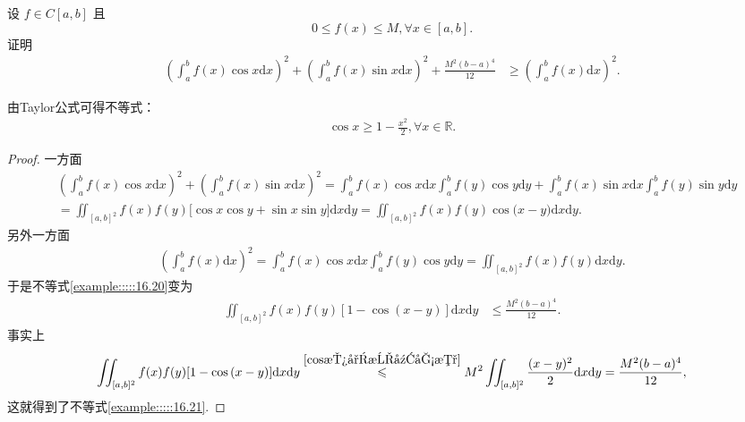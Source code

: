 \documentclass[../../main.tex]{subfiles}
\begin{document}
\begin{example}
设 $f \in C[a,b]$ 且
\[0 \leqslant f(x) \leqslant M, \forall x \in [a,b].\]
证明
\begin{align}\label{example:::::16.20}
\left(\int_{a}^{b}f(x)\cos x\mathrm{d}x\right)^2 + \left(\int_{a}^{b}f(x)\sin x\mathrm{d}x\right)^2 + \frac{M^2(b - a)^4}{12} &\geqslant \left(\int_{a}^{b}f(x)\mathrm{d}x\right)^2.
\end{align}
\end{example}
\begin{remark}
由Taylor公式可得不等式：
\begin{align}\label{cos放小成幂函数}
\cos x\geq 1-\frac{x^2}{2},\forall x\in \mathbb{R}.
\end{align}
\end{remark}
\begin{proof}
一方面
\begin{align*}
&\left( \int_a^b{f(x)\cos x\mathrm{d}x} \right) ^2+\left( \int_a^b{f(x)\sin x\mathrm{d}x} \right) ^2=\int_a^b{f(x)\cos x\mathrm{d}x}\int_a^b{f(y)\cos y\mathrm{d}y}+\int_a^b{f(x)\sin x\mathrm{d}x}\int_a^b{f(y)\sin y\mathrm{d}y}
\\
&=\iint_{[a,b]^2}{f(x)f(y)[\cos x\cos y}+\sin x\sin y]\mathrm{d}x\mathrm{d}y=\iint_{[a,b]^2}{f(x)f(y)\cos\mathrm{(}x}-y)\mathrm{d}x\mathrm{d}y.
\end{align*}
另外一方面
\begin{align*}
\left( \int_a^b{f(x)\mathrm{d}x} \right) ^2=\int_a^b{f(x)\cos x\mathrm{d}x}\int_a^b{f(y)\cos y\mathrm{d}y}=\iint_{[a,b]^2}{f(x)f(y)\mathrm{d}x\mathrm{d}y.}
\end{align*}
于是不等式\eqref{example:::::16.20}变为
\begin{align}\label{example:::::16.21}
\iint_{[a,b]^2}f(x)f(y)[1 - \cos(x - y)]\mathrm{d}x\mathrm{d}y &\leqslant \frac{M^2(b - a)^4}{12}.
\end{align}
事实上
\begin{align*}
\iint_{[a,b]^2}{f(x)f(y)[1}-\cos\mathrm{(}x-y)]\mathrm{d}x\mathrm{d}y\overset{\eqref{cos放小成幂函数}}{\leqslant}M^2\iint_{[a,b]^2}{\frac{(x-y)^2}{2}\mathrm{d}x\mathrm{d}y}=\frac{M^2(b-a)^4}{12},
\end{align*}
这就得到了不等式\eqref{example:::::16.21}. 
\end{proof}
\end{document}

